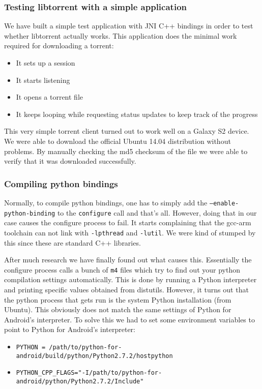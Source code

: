 		\subsubsection{Testing libtorrent with a simple application}
			We have built a simple test application with JNI C++ bindings in order to test whether libtorrent actually works. This application does the minimal work required for downloading a torrent:
			\begin{itemize}
			\item It sets up a session
			\item It starts listening
			\item It opens a torrent file
			\item It keeps looping while requesting status updates to keep track of the progress
			\end{itemize}
			This very simple torrent client turned out to work well on a Galaxy S2 device. We were able to download the official Ubuntu 14.04 distribution without problems. By manually checking the md5 checksum of the file we were able to verify that it was downloaded successfully.
		
		\subsubsection{Compiling python bindings}
			Normally, to compile python bindings, one has to simply add the \texttt{--enable-python-binding} to the \texttt{configure} call and that's all. However, doing that in our case causes the configure process to fail. It starts complaining that the gcc-arm toolchain can not link with \texttt{-lpthread} and \texttt{-lutil}. We were kind of stumped by this since these are standard C++ libraries.
			
			After much research we have finally found out what causes this. Essentially the configure process calls a bunch of \texttt{m4} files which try to find out your python compilation settings automatically. This is done by running a Python interpreter and printing specific values obtained from distutils. However, it turns out that the python process that gets run is the system Python installation (from Ubuntu). This obviously does not match the same settings of Python for Android's interpreter. To solve this we had to set some environment variables to point to Python for Android's interpreter:
			
			\begin{itemize}
				\item \texttt{PYTHON = /path/to/python-for-android/build/python/Python2.7.2/hostpython}
				\item \texttt{PYTHON\_CPP\_FLAGS="-I/path/to/python-for-android/python/Python2.7.2/Include"}
			\end{itemize}
			
